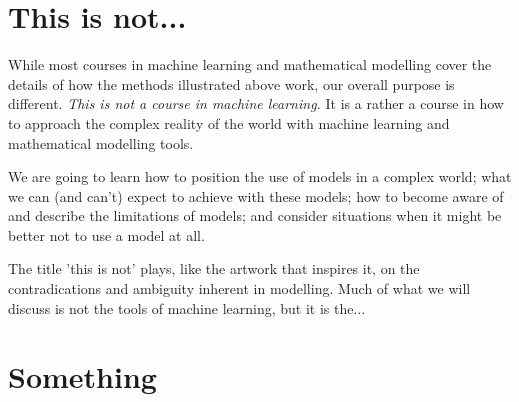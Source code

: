 
\section{This is not...}

While most courses in machine learning and mathematical modelling cover the details of how the methods illustrated above work, our overall purpose is different. {\it This is not a course in machine learning.} It is a rather a course in how to approach the complex reality of the world with machine learning and mathematical modelling tools.

We are going to learn how to position the use of models in a complex world; what we can (and can't) expect to achieve with these models; how to become aware of and describe the limitations of models; and consider situations when it might be better not to use a model at all.  

The title 'this is not' plays, like the artwork that inspires it, on the contradications and ambiguity inherent in modelling. Much of what we will discuss is not the tools of machine learning, but it is the... 


\section{Something}
